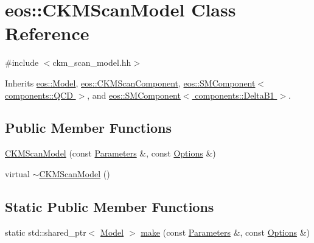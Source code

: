 \hypertarget{classeos_1_1CKMScanModel}{
\section{eos::CKMScanModel Class Reference}
\label{classeos_1_1CKMScanModel}
}


{\ttfamily \#include $<$ckm\_\-scan\_\-model.hh$>$}

Inherits \hyperlink{classeos_1_1Model}{eos::Model}, \hyperlink{classeos_1_1CKMScanComponent}{eos::CKMScanComponent}, \hyperlink{classeos_1_1SMComponent_3_01components_1_1QCD_01_4}{eos::SMComponent$<$ components::QCD $>$}, and \hyperlink{classeos_1_1SMComponent_3_01components_1_1DeltaB1_01_4}{eos::SMComponent$<$ components::DeltaB1 $>$}.\subsection*{Public Member Functions}
\begin{DoxyCompactItemize}
\item 
\hyperlink{classeos_1_1CKMScanModel_a348fbaeb80dc246db6d94fc704b34ddc}{CKMScanModel} (const \hyperlink{classeos_1_1Parameters}{Parameters} \&, const \hyperlink{classeos_1_1Options}{Options} \&)
\item 
virtual \hyperlink{classeos_1_1CKMScanModel_a33220021fdd61915cdbe327481f01122}{$\sim$CKMScanModel} ()
\end{DoxyCompactItemize}
\subsection*{Static Public Member Functions}
\begin{DoxyCompactItemize}
\item 
static std::shared\_\-ptr$<$ \hyperlink{classeos_1_1Model}{Model} $>$ \hyperlink{classeos_1_1CKMScanModel_a78a49c4da540e56430d800173d129cc3}{make} (const \hyperlink{classeos_1_1Parameters}{Parameters} \&, const \hyperlink{classeos_1_1Options}{Options} \&)
\end{DoxyCompactItemize}



